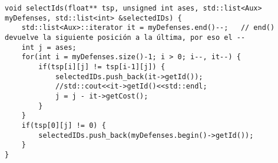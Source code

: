 \begin{lstlisting}
void selectIds(float** tsp, unsigned int ases, std::list<Aux> myDefenses, std::list<int> &selectedIDs) {
    std::list<Aux>::iterator it = myDefenses.end()--;   // end() devuelve la siguiente posición a la última, por eso el --
    int j = ases;
    for(int i = myDefenses.size()-1; i > 0; i--, it--) {
        if(tsp[i][j] != tsp[i-1][j]) {
            selectedIDs.push_back(it->getId());
            //std::cout<<it->getId()<<std::endl;
            j = j - it->getCost();
        }
    }
    if(tsp[0][j] != 0) {
        selectedIDs.push_back(myDefenses.begin()->getId());
    }
}
\end{lstlisting}